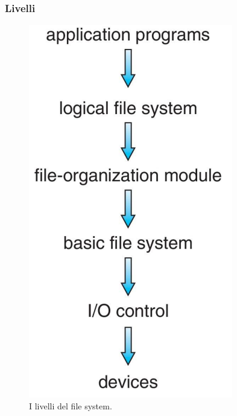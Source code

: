 \subsubsection{Livelli}\label{layers}
\begin{figure}
  \includegraphics[width = \linewidth]{../res/imgs/file system implementation/file system layers.png}
  \caption{I livelli del file system.}
  \label{fig:file system layers}
\end{figure}
